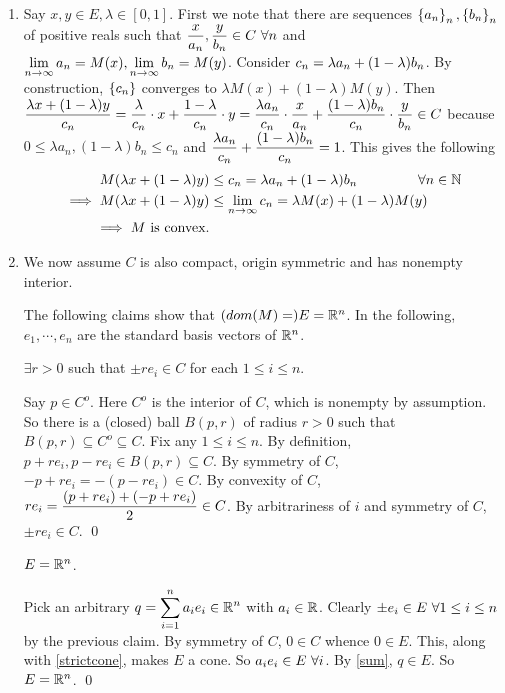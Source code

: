 \begin{enumerate}[leftmargin=*]
\item Say $x,y\in E,\lambda\in[0,1]$. First we note that there are sequences $\left\{a_{n}\right\}_{n}, \left\{b_{n}\right\}_{n}$ of positive reals such that $\displaystyle\frac{x}{a_{n}},\frac{y}{b_{n}} \in C~\forall n$ and $\displaystyle\lim_{n\to\infty}a_{n} = M(x), \lim_{n\to\infty}b_{n} = M(y)$. Consider $\displaystyle c_{n} = \lambda a_{n} + (1-\lambda)b_{n}$. By construction, $\left\{c_{n}\right\}$ converges to $\lambda M(x) + (1-\lambda) M(y)$. Then $\displaystyle\frac{\lambda x + (1-\lambda)y}{c_{n}} = \frac{\lambda }{c_{n}}\cdot x + \frac{1-\lambda }{c_{n}}\cdot y = \frac{\lambda a_{n}}{c_{n}}\cdot\frac{x}{a_{n}} + \frac{(1-\lambda) b_{n}}{c_{n}}\cdot\frac{y}{b_{n}} \in C$ because $0\le \lambda a_{n}, (1-\lambda)b_{n} \le c_{n}$ and $\displaystyle\frac{\lambda a_{n}}{c_{n}} + \frac{(1-\lambda) b_{n}}{c_{n}} = 1$. This gives the following
\begin{align*}
M(\lambda x + (1-\lambda)y) &\le c_{n} =\lambda a_{n} + (1-\lambda)b_{n}  \qquad\qquad~\forall n\in \mathbb{N}\\
\implies M(\lambda x + (1-\lambda)y) &\le \lim_{n\to\infty}c_{n} = \lambda M(x) + (1-\lambda) M(y)\\
\implies M \text{ is convex.}
\end{align*}
\item We now assume $C$ is also compact, origin symmetric and has nonempty interior. 

The following claims show that $(dom(M)=)E=\mathbb{R}^{n}$. In the following, $e_{1},\cdots,e_{n}$ are the standard basis vectors of $\mathbb{R}^{n}$.

\begin{cl}\label{open}
$\exists r>0$ such that $\pm r e_{i}\in C$ for each $1\le i\le n$.
\end{cl}
\begin{pf}{
Say $p\in C^{o}$. Here $C^{o}$ is the interior of $C$, which is nonempty by assumption. So there is a (closed) ball $B(p,r)$ of radius $r>0$ such that $B(p,r)\subseteq C^{o}\subseteq C$. Fix any $1\le i\le n$. By definition, $p+ r e_{i}, p-re_{i} \in B(p,r)\subseteq C$. By symmetry of $C$, $-p+re_{i}=-(p-re_{i}) \in C$. By convexity of $C$, $\displaystyle re_{i} = \frac{(p+ r e_{i}) + (-p+re_{i})}{2} \in C$. By arbitrariness of $i$ and symmetry of $C$, $\pm re_{i}\in C$.
\qed}\end{pf}

\begin{cl}
$E=\mathbb{R}^{n}$.
\end{cl}
\begin{pf}{
Pick an arbitrary $\displaystyle q = \sum_{i=1}^{n}a_{i} e_{i}\in\mathbb{R}^{n}$ with $a_{i}\in\mathbb{R}$. Clearly $\pm e_{i}\in E~\forall 1\le i\le n$ by the previous claim. By symmetry of $C$, $0\in C$ whence $0\in E$. This, along with \cref{strictcone}, makes $E$ a cone. So $a_{i} e_{i}\in E~\forall i$. By \cref{sum}, $q\in E$. So $E=\mathbb{R}^{n}$.
\qed}\end{pf}


\end{enumerate}
